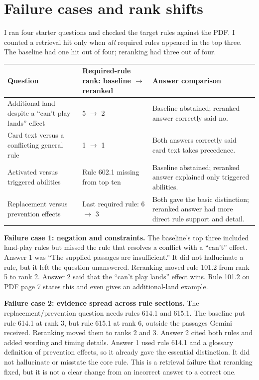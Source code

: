 \documentclass[11pt,a4paper]{article}
\begin{document}
\section*{Failure cases and rank shifts}
I ran four starter questions and checked the target rules against the PDF. I counted a retrieval hit only when \emph{all} required rules appeared in the top three. The baseline had one hit out of four; reranking had three out of four.

\begin{center}
\small
\begin{tabularx}{\textwidth}{@{}>{\raggedright\arraybackslash}X p{2.5cm} >{\raggedright\arraybackslash}p{5.1cm}@{}}
\toprule
Question & Required-rule rank: baseline $\rightarrow$ reranked & Answer comparison \\
\midrule
Additional land despite a ``can't play lands'' effect & 5 $\rightarrow$ 2 & Baseline abstained; reranked answer correctly said no. \\
Card text versus a conflicting general rule & 1 $\rightarrow$ 1 & Both answers correctly said card text takes precedence. \\
Activated versus triggered abilities & Rule 602.1 missing from top ten & Baseline abstained; reranked answer explained only triggered abilities. \\
Replacement versus prevention effects & Last required rule: 6 $\rightarrow$ 3 & Both gave the basic distinction; reranked answer had more direct rule support and detail. \\
\bottomrule
\end{tabularx}
\end{center}

\textbf{Failure case 1: negation and constraints.} The baseline's top three included land-play rules but missed the rule that resolves a conflict with a ``can't'' effect. Answer 1 was ``The supplied passages are insufficient.'' It did not hallucinate a rule, but it left the question unanswered. Reranking moved rule 101.2 from rank 5 to rank 2. Answer 2 said that the ``can't play lands'' effect wins. Rule 101.2 on PDF page 7 states this and even gives an additional-land example.

\textbf{Failure case 2: evidence spread across rule sections.} The replacement/prevention question needs rules 614.1 and 615.1. The baseline put rule 614.1 at rank 3, but rule 615.1 at rank 6, outside the passages Gemini received. Reranking moved them to ranks 2 and 3. Answer 2 cited both rules and added wording and timing details. Answer 1 used rule 614.1 and a glossary definition of prevention effects, so it already gave the essential distinction. It did not hallucinate or misstate the core rule. This is a retrieval failure that reranking fixed, but it is not a clear change from an incorrect answer to a correct one.
\end{document}
